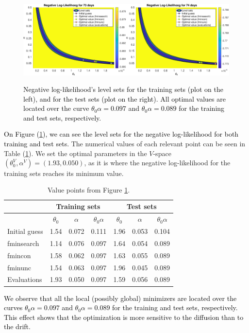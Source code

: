 \documentclass[11pt]{article}
\theoremstyle{definition}
\newcommand{\red}{\textcolor{black}}
\begin{document}
\begin{figure}[H]
\centering
\includegraphics[width=0.5\textwidth]{plots/LL/Log-Likelihood.eps}\includegraphics[width=0.5\textwidth]{plots/LL/Log-Likelihood_testing.eps}
\caption{\red{Negative log-likelihood's level sets for the training sets (plot on the left), and for the test sets (plot on the right). All optimal values are located over the curve $\theta_0\alpha=0.097$ and $\theta_0\alpha=0.089$ for the training and test sets, respectively.}}
\label{fig:neg-LL}
\end{figure}
\red{On Figure (\ref{fig:neg-LL}), we can see the level sets for the negative log-likelihood for both training and test sets.} The numerical values of each relevant point can be seen in Table (\ref{tab:optimal_values}). We set the optimal parameters in the $V$-space $(\theta_0^V,\alpha^V)=(1.93,0.050)$, as it is where the negative log-likelihood for the training sets reaches its minimum value.
\begin{table}[H]
\centering
\begin{tabular}{lcccccc}
\toprule
 & \multicolumn{3}{c}{Training sets} & \multicolumn{3}{c}{Test sets} \\
 \midrule
 & $\theta_0$ & $\alpha$ & $\theta_0\alpha$ & $\theta_0$ & $\alpha$ & $\theta_0\alpha$\\
 \midrule
 Initial guess & 1.54 & 0.072 & 0.111 & 1.96 & 0.053 & 0.104 \\
 fminsearch & 1.14 & 0.076 & 0.097 & 1.64 & 0.054 & 0.089 \\
 fmincon & 1.58 & 0.062 & 0.097 & 1.63 & 0.055 & 0.089 \\
 fminunc & 1.54 & 0.063 & 0.097 & 1.96 & 0.045 & 0.089 \\
 Evaluations & 1.93 & 0.050 & 0.097 & 1.59 & 0.056 & 0.089 \\
 \bottomrule
\end{tabular}
\caption{Value points from Figure \ref{fig:neg-LL}.}
\label{tab:optimal_values}
\end{table}
\red{We observe that all the local (possibly global) minimizers are located over the curves $\theta_0\alpha=0.097$ and $\theta_0\alpha=0.089$ for the training and test sets, respectively. This effect shows that the optimization is more sensitive to the diffusion than to the drift.}\\
\end{document}
